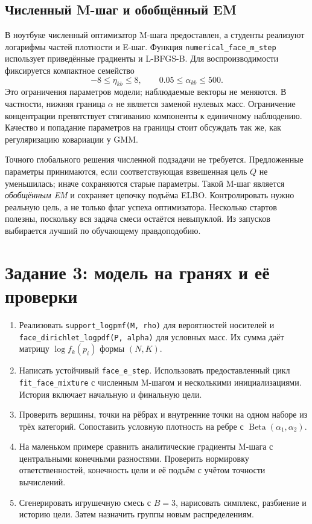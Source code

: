 \documentclass[11pt,a4paper]{article}
\begin{document}
\subsection{Численный M-шаг и обобщённый EM}
В ноутбуке численный оптимизатор M-шага предоставлен, а студенты реализуют
логарифмы частей плотности и E-шаг. Функция
\texttt{numerical\_face\_m\_step} использует приведённые градиенты
и L-BFGS-B. Для воспроизводимости фиксируется компактное семейство
\[
 -8\leq\eta_{kb}\leq8,\qquad 0.05\leq\alpha_{kb}\leq500.
\]
Это ограничения параметров модели; наблюдаемые векторы не меняются.
В частности, нижняя граница $\alpha$ не является заменой нулевых масс.
Ограничение концентрации препятствует стягиванию компоненты к единичному
наблюдению. Качество и попадание параметров на границы стоит обсуждать
так же, как регуляризацию ковариации у GMM.

Точного глобального решения численной подзадачи не требуется.
Предложенные параметры принимаются, если соответствующая взвешенная
цель $Q$ не уменьшилась; иначе сохраняются старые параметры.
Такой M-шаг является \emph{обобщённым EM} и сохраняет цепочку подъёма ELBO.
Контролировать нужно реальную цель, а не только флаг успеха оптимизатора.
Несколько стартов полезны, поскольку вся задача смеси остаётся невыпуклой.
Из запусков выбирается лучший по обучающему правдоподобию.

\section{Задание 3: модель на гранях и её проверки}

\begin{enumerate}
\item Реализовать \texttt{support\_logpmf(M, rho)} для вероятностей
носителей и \texttt{face\_dirichlet\_logpdf(P, alpha)} для условных
масс. Их сумма даёт матрицу $\log f_k(p_i)$ формы $(N,K)$.
\item Написать устойчивый \texttt{face\_e\_step}. Использовать
предоставленный цикл \texttt{fit\_face\_mixture} с численным M-шагом
и несколькими инициализациями. История включает начальную и финальную цели.
\item Проверить вершины, точки на рёбрах и внутренние точки на одном наборе
из трёх категорий. Сопоставить условную плотность на ребре с
$\operatorname{Beta}(\alpha_1,\alpha_2)$.
\item На маленьком примере сравнить аналитические градиенты M-шага с
центральными конечными разностями. Проверить нормировку ответственностей,
конечность цели и её подъём с учётом точности вычислений.
\item Сгенерировать игрушечную смесь с $B=3$, нарисовать симплекс,
разбиение и историю цели. Затем назначить группы новым распределениям.
\end{enumerate}
\end{document}
